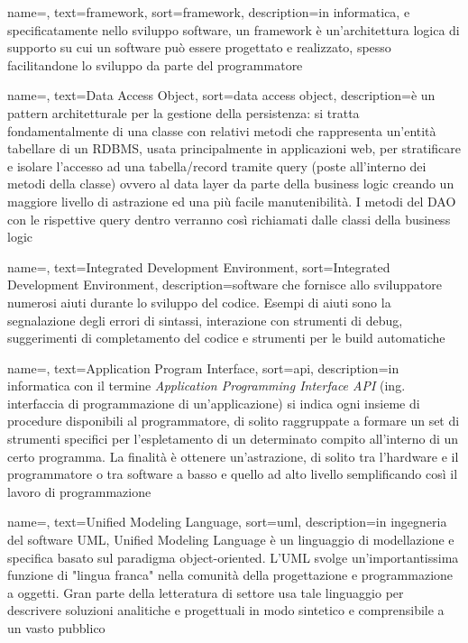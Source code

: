 {
    name=,
    text=framework,
    sort=framework,
    description={in informatica, e specificatamente nello sviluppo software, un framework è un’architettura logica di supporto su cui un software può essere progettato e realizzato, spesso facilitandone lo sviluppo da parte del programmatore}
}

{
    name=,
    text=Data Access Object,
    sort=data access object,
    description={è un pattern architetturale per la gestione della persistenza: si tratta fondamentalmente di una classe con relativi metodi che rappresenta un’entità tabellare di un RDBMS, usata principalmente in applicazioni web, per stratificare e isolare l’accesso ad una tabella/record tramite query (poste all’interno dei metodi della classe) ovvero al data layer da parte della business logic creando un maggiore livello di astrazione ed una più facile manutenibilità. I metodi del DAO con le rispettive query dentro verranno così richiamati dalle classi della business logic}
}

{
    name=,
    text=Integrated Development Environment,
    sort=Integrated Development Environment,
    description={software che fornisce allo sviluppatore numerosi aiuti durante lo sviluppo del codice. Esempi di aiuti sono la segnalazione degli errori di sintassi, interazione con strumenti di debug, suggerimenti di completamento del codice e strumenti per le build automatiche}
}

{
    name=,
    text=Application Program Interface,
    sort=api,
    description={in informatica con il termine \emph{Application Programming Interface API} (ing. interfaccia di programmazione di un'applicazione) si indica ogni insieme di procedure disponibili al programmatore, di solito raggruppate a formare un set di strumenti specifici per l'espletamento di un determinato compito all'interno di un certo programma. La finalità è ottenere un'astrazione, di solito tra l'hardware e il programmatore o tra software a basso e quello ad alto livello semplificando così il lavoro di programmazione}
}

{
    name=,
    text=Unified Modeling Language,
    sort=uml,
    description={in ingegneria del software UML, Unified Modeling Language è un linguaggio di modellazione e specifica basato sul paradigma object-oriented. L'UML svolge un’importantissima funzione di "lingua franca" nella comunità della progettazione e programmazione a oggetti. Gran parte della letteratura di settore usa tale linguaggio per descrivere soluzioni analitiche e progettuali in modo sintetico e comprensibile a un vasto pubblico}
}
